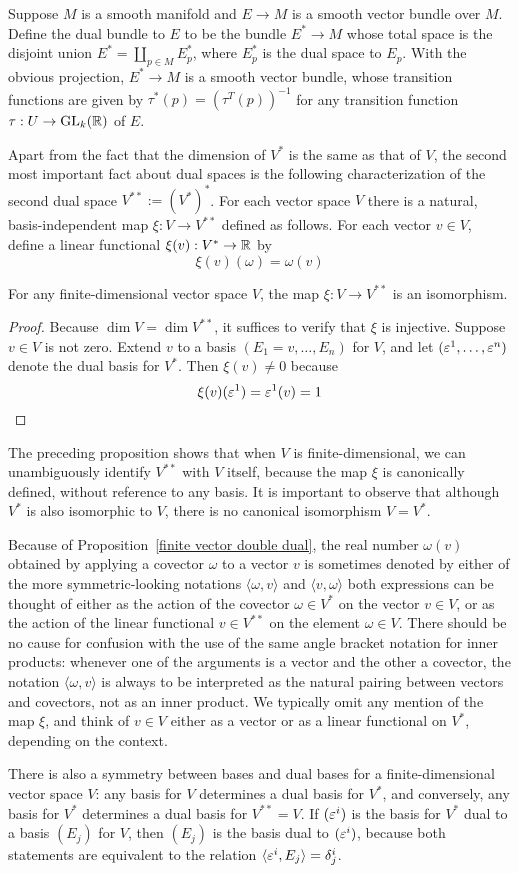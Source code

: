 \begin{corollary}
Suppose $M$ is a smooth manifold and $E\to M$ is a smooth vector bundle over $M$. Define the dual bundle to $E$ to be the bundle $E^*\to M$ whose total space is the disjoint union $E^*=\coprod_{p\in M}E_p^*$, where $E_p^*$ is the dual space to $E_p$. With the obvious projection, $E^*\to M$ is a smooth vector bundle, whose transition functions are given by $\tau^*(p)=(\tau^T(p))^{-1}$ for any transition function $\tau:U\to\mathrm{GL}_k(\mathbb{R})$ of $E$.
\end{corollary}
Apart from the fact that the dimension of $V^*$ is the same as that of $V$, the second most important fact about dual spaces is the following characterization of the second dual space $V^{**}:=(V^*)^*$. For each vector space $V$ there is a natural, basis-independent map $\xi:V\to V^{**}$ defined as follows. For each vector $v\in V$, define a linear functional $\xi(v):V^*\to\mathbb{R}$ by
\[\xi(v)(\omega)=\omega(v)\]
\begin{proposition}\label{finite vector double dual}
For any finite-dimensional vector space $V$, the map $\xi:V\to V^{**}$ is an isomorphism.
\end{proposition}
\begin{proof}
Because $\dim V=\dim V^{**}$, it suffices to verify that $\xi$ is injective. Suppose $v\in V$ is not zero. Extend $v$ to a basis $(E_1=v,\dots,E_n)$ for $V$, and let $(\varepsilon^1,\dots,\varepsilon^n)$ denote the dual basis for $V^*$. Then $\xi(v)\neq 0$ because
\[\xi(v)(\varepsilon^1)=\varepsilon^1(v)=1\]
\end{proof}
The preceding proposition shows that when $V$ is finite-dimensional, we can unambiguously
identify $V^{**}$ with $V$ itself, because the map $\xi$ is canonically defined, without reference to any basis. It is important to observe that although $V^*$ is also isomorphic to $V$, there is no canonical isomorphism $V=V^*$.\par
Because of Proposition~\ref{finite vector double dual}, the real number $\omega(v)$ obtained by applying a covector $\omega$ to a vector $v$ is sometimes denoted by either of the more symmetric-looking notations $\langle\omega,v\rangle$ and $\langle v,\omega\rangle$ both expressions can be thought of either as the action of the covector $\omega\in V^*$ on the vector $v\in V$, or as the action of the linear functional $v\in V^{**}$ on the element $\omega\in V$. There should be no cause for confusion with the use of the same angle bracket notation for inner products: whenever one of the arguments is a vector and the other a covector, the notation $\langle\omega,v\rangle$ is always to be interpreted as the natural pairing between vectors and covectors, not as an inner product. We typically omit any mention of the map $\xi$, and think of $v\in V$ either as a vector or as a linear functional on $V^*$, depending on the context.\par
There is also a symmetry between bases and dual bases for a finite-dimensional vector space $V$: any basis for $V$ determines a dual basis for $V^*$, and conversely, any basis for $V^*$ determines a dual basis for $V^{**}=V$. If $(\varepsilon^i)$ is the basis for $V^*$ dual
to a basis $(E_j)$ for $V$, then $(E_j)$ is the basis dual to $(\varepsilon^i)$, because both statements are equivalent to the relation $\langle\varepsilon^i,E_j\rangle=\delta^i_j$.

